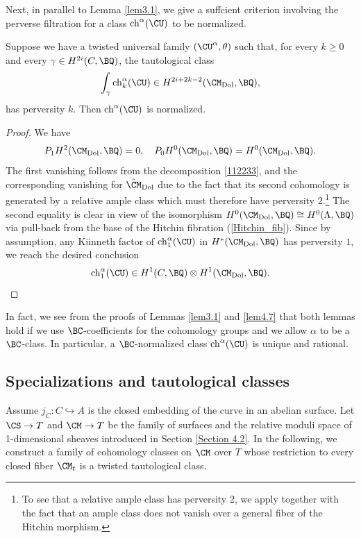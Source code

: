 Next, in parallel to Lemma \ref{lem3.1},  we give a suffcient criterion involving the perverse filtration  for a class $\mathrm{ch}^\alpha(\CU)$ to be normalized.

\begin{lem}
\notready\label{lem4.7}
Suppose we have a twisted universal family $(\CU^\alpha, \theta)$ such that, for every $k \geq 0$ and
every $\gamma \in H^{2i}(C, \BQ)$, the tautological class
\begin{equation*}
\int_\gamma \mathrm{ch}^\alpha_k(\CU) \in H^{2i+2k-2}(\CM_\mathrm{Dol}, \BQ),
\end{equation*}
has perversity $k$. Then $\mathrm{ch}^\alpha(\CU)$ is normalized.
\end{lem}

\begin{proof}
We have
\[
 P_1H^2(\CM_{\mathrm{Dol}}, \BQ) = 0, \quad  P_0H^0(\CM_{\mathrm{Dol}}, \BQ)=H^0(\CM_{\mathrm{Dol}}, \BQ).
\]
The first vanishing follows from the decomposition \eqref{112233}, and the corresponding vanishing for $\hat{\CM}_{\mathrm{Dol}}$ due to the fact that its second cohomology is generated by a relative ample class which must therefore have perversity $2$.\footnote{To see that a relative ample class has perversity 2, we apply \cite[Theorem 1.4.8]{dCHM1} together with the fact that an ample class does not vanish over a general fiber of the Hitchin morphism.} The second equality is clear in view of the isomorphism $H^0 (\CM_{\mathrm{Dol}},\BQ) \cong H^0 (\Lambda, \BQ)$ via pull-back from the base of the Hitchin fibration (\ref{Hitchin_fib}).
Since by assumption, any K\"unneth factor of $\mathrm{ch}_1^\alpha(\CU)$ in $H^*(\CM_{\mathrm{Dol}}, \BQ)$ has perversity $1$, we reach the desired conclusion
\[
\mathrm{ch}_1^\alpha(\CU) \in  H^1(C, \BQ)\otimes H^1(\CM_\mathrm{Dol} ,\BQ). \qedhere
\]
\end{proof}

\begin{rmk}
\notready\label{rmk4.8}
In fact, we see from the proofs of Lemmas \ref{lem3.1} and \ref{lem4.7} that both lemmas hold if we use $\BC$-coefficients for the cohomology groups and we allow $\alpha$ to be a $\BC$-class. In particular, a $\BC$-normalized class $\mathrm{ch}^\alpha(\CU)$ is unique and rational.
\end{rmk}



\subsection{Specializations and tautological classes}
Assume $j_C: C\hookrightarrow A$ is the closed embedding of the curve in an abelian surface. Let $\CS \to T$ and $\CM \to T$ be the family of surfaces and the relative moduli space of 1-dimensional sheaves introduced in Section \ref{Section 4.2}. In the following, we construct a family of cohomology classes on $\CM$ over $T$ whose restriction to every closed fiber $\CM_t$ is a twisted tautological class.

